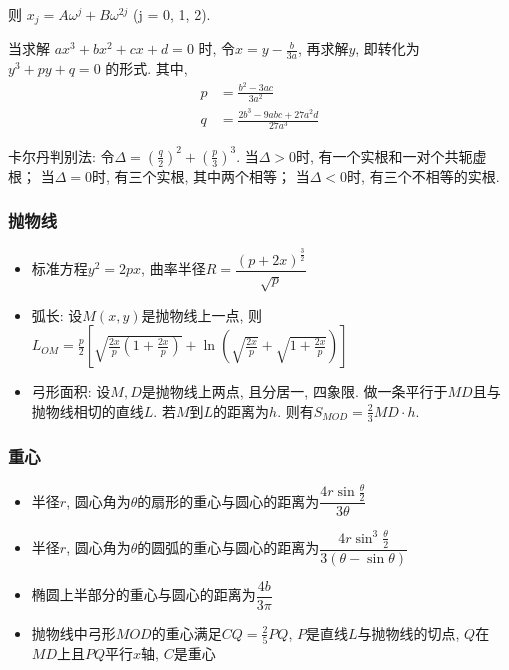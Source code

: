 \documentclass[10pt, a4paper]{article}
\begin{document}
      则 $x_j = A\omega^{j} + B\omega^{2j}$ (j = 0, 1, 2).
      
      当求解 $ax ^ 3 + bx ^ 2 + cx + d = 0$ 时, 令$x = y - \frac{b}{3a}$, 再求解$y$, 即转化为$y^3 + py + q = 0$ 的形式. 
      其中, 
      \begin{align*}
        p &= \frac{b^2 - 3ac}{3a^2} \\
        q &= \frac{2b ^ 3 - 9 abc + 27 a ^ 2 d}{27 a ^ 3}
      \end{align*}

      卡尔丹判别法: 
      令$\Delta = (\frac{q}{2}) ^ 2 + (\frac{p}{3}) ^ 3$. 
      当$\Delta > 0$时, 有一个实根和一对个共轭虚根；
      当$\Delta = 0$时, 有三个实根, 其中两个相等；
      当$\Delta < 0$时, 有三个不相等的实根. 
    
    \subsubsection{抛物线}
    \begin{itemize}
      \item 标准方程$y^2 = 2px$, 曲率半径$ R = \dfrac{(p + 2x)^{\frac{3}{2} }}{\sqrt{p}}$
      \item 弧长: 设$M(x, y)$是抛物线上一点, 则$L_{OM} = \frac{p}{2} [ \sqrt{\frac{2x}{p}(1 + \frac{2x}{p})} + \ln(\sqrt{\frac{2x}{p}} + \sqrt{1 + \frac{2x}{p}})]$
      \item 弓形面积: 设$M, D$是抛物线上两点, 且分居一, 四象限. 做一条平行于$MD$且与抛物线相切的直线$L$. 若$M$到$L$的距离为$h$. 则有$S_{MOD} = \frac{2}{3}MD \cdot h$.
    \end{itemize}

    \subsubsection{重心}
    \begin{itemize}
      \item 半径$r$, 圆心角为$\theta$的扇形的重心与圆心的距离为$\dfrac{4r\sin\frac{\theta}{2}}{3\theta}$
      \item 半径$r$, 圆心角为$\theta$的圆弧的重心与圆心的距离为$\dfrac{4r\sin^3\frac{\theta}{2}}{3(\theta - \sin\theta)}$
      \item 椭圆上半部分的重心与圆心的距离为$\dfrac{4b}{3\pi}$
      \item  抛物线中弓形$MOD$的重心满足$CQ = \frac{2}{5} PQ$, $P$是直线$L$与抛物线的切点, $Q$在$MD$上且$PQ$平行$x$轴, $C$是重心
    \end{itemize}
\end{document}
